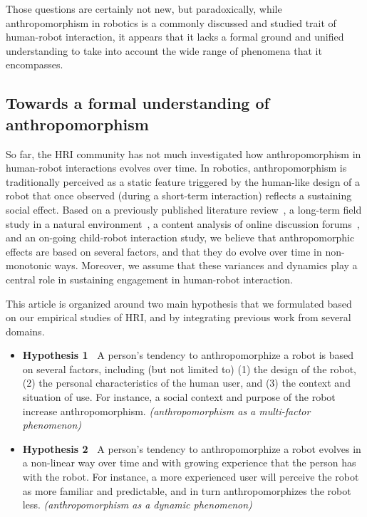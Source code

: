 \documentclass{frontiersSCNS} %
\begin{document}
Those questions are certainly not new, but paradoxically, while anthropomorphism
in robotics is a commonly discussed and studied trait of human-robot
interaction, it appears that it lacks a formal ground and unified understanding to
take into account the wide range of phenomena that it encompasses.

\subsection{Towards a formal understanding of anthropomorphism}

So far, the HRI community has not much investigated how anthropomorphism in
human-robot interactions evolves over time. In robotics, anthropomorphism is traditionally
perceived as a static feature triggered by the human-like design of a robot that once observed (during a
short-term interaction) reflects a sustaining social effect. Based on a previously published
literature review~\citep{fink_anthropomorphism_2012}, a
long-term field study in a natural environment~\citep{fink_living_2013}, a 
content analysis of online discussion 
forums~\citep{fink_anthropomorphic_2012}, and an on-going child-robot 
interaction study, we believe that anthropomorphic
effects are based on several factors, and that they do evolve over time in 
non-monotonic ways. Moreover, we assume that these variances and dynamics 
play a central role in sustaining engagement in human-robot interaction.

This article is organized around two main hypothesis that we formulated based on 
our empirical studies of HRI, and by integrating previous work from several domains. 

\begin{itemize}
    \item \textbf{Hypothesis 1~} A person's tendency to anthropomorphize a robot
is based on several factors, including (but not limited to) (1) the 
design of the robot, (2) the personal characteristics of the human user, 
and (3) the context and situation of use. For instance, a social 
context and purpose of the robot increase anthropomorphism. 
\textit{(anthropomorphism as a multi-factor phenomenon)}
	\item \textbf{Hypothesis 2~} A person's tendency to anthropomorphize a robot 
evolves in a non-linear way over time and with growing experience that the 
person has with the robot. For instance, a more experienced user will perceive 
the robot as more familiar and predictable, and in turn anthropomorphizes the 
robot less. \textit{(anthropomorphism as a dynamic phenomenon)}
\end{itemize}
\end{document}
